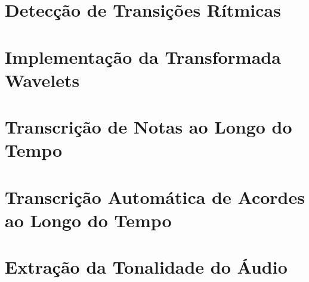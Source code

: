 \section{Detecção de Transições Rítmicas}

\section{Implementação da Transformada Wavelets}

\section{Transcrição de Notas ao Longo do Tempo}

\section{Transcrição Automática de Acordes ao Longo do Tempo}

\section{Extração da Tonalidade do Áudio}
